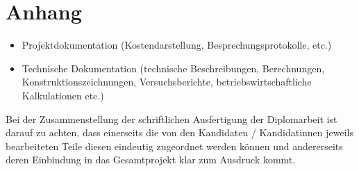 
\chapter*{Anhang}


\begin{itemize}
 \item Projektdokumentation (Kostendarstellung, Besprechungsprotokolle, etc.)
 \item Technische Dokumentation (technische Beschreibungen, Berechnungen, Konstruktionszeichnungen, Versuchsberichte, betriebswirtschaftliche Kalkulationen etc.)
\end{itemize}

Bei der Zusammenstellung der schriftlichen Ausfertigung der Diplomarbeit ist darauf zu achten, dass einerseits die von den Kandidaten / Kandidatinnen jeweils bearbeiteten Teile
diesen eindeutig zugeordnet werden können und andererseits deren Einbindung in das Gesamtprojekt klar zum Ausdruck kommt.
